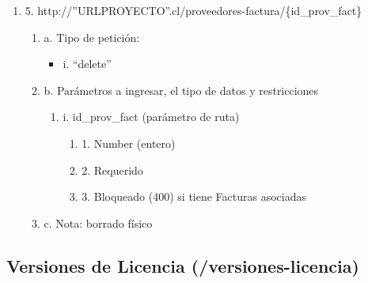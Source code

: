 \begin{enumerate}
    \item 5. http://”URLPROYECTO”.cl/proveedores-factura/\{id\_prov\_fact\}
    \begin{enumerate}
        \item a. Tipo de petición:
            \begin{itemize}
               \item i. “delete”
            \end{itemize}
        \item b. Parámetros a ingresar, el tipo de datos y restricciones
            \begin{enumerate}
                \item i. id\_prov\_fact (parámetro de ruta)
                    \begin{enumerate}
                        \item 1. Number (entero)
                        \item 2. Requerido
                        \item 3. Bloqueado (400) si tiene Facturas asociadas
                    \end{enumerate}
            \end{enumerate}
        \item c. Nota: borrado físico
    \end{enumerate}
\end{enumerate}

\subsection{Versiones de Licencia (/versiones-licencia)}

